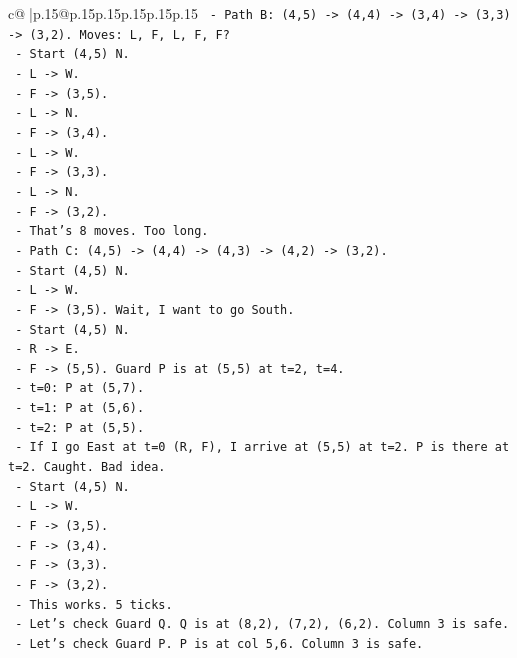 \documentclass{article}
\begin{document}
{\begin{supertabular}{c@{$\;$}|p{.15\linewidth}@{}p{.15\linewidth}p{.15\linewidth}p{.15\linewidth}p{.15\linewidth}p{.15\linewidth}}
{{{\texttt{    {-} Path B: (4,5) {-}> (4,4) {-}> (3,4) {-}> (3,3) {-}> (3,2). Moves: L, F, L, F, F?} \\
\texttt{      {-} Start (4,5) N.} \\
\texttt{      {-} L {-}> W.} \\
\texttt{      {-} F {-}> (3,5).} \\
\texttt{      {-} L {-}> N.} \\
\texttt{      {-} F {-}> (3,4).} \\
\texttt{      {-} L {-}> W.} \\
\texttt{      {-} F {-}> (3,3).} \\
\texttt{      {-} L {-}> N.} \\
\texttt{      {-} F {-}> (3,2).} \\
\texttt{      {-} That's 8 moves. Too long.} \\
\texttt{    {-} Path C: (4,5) {-}> (4,4) {-}> (4,3) {-}> (4,2) {-}> (3,2).} \\
\texttt{      {-} Start (4,5) N.} \\
\texttt{      {-} L {-}> W.} \\
\texttt{      {-} F {-}> (3,5). Wait, I want to go South.} \\
\texttt{      {-} Start (4,5) N.} \\
\texttt{      {-} R {-}> E.} \\
\texttt{      {-} F {-}> (5,5). Guard P is at (5,5) at t=2, t=4.} \\
\texttt{        {-} t=0: P at (5,7).} \\
\texttt{        {-} t=1: P at (5,6).} \\
\texttt{        {-} t=2: P at (5,5).} \\
\texttt{        {-} If I go East at t=0 (R, F), I arrive at (5,5) at t=2. P is there at t=2. Caught. Bad idea.} \\
\texttt{      {-} Start (4,5) N.} \\
\texttt{      {-} L {-}> W.} \\
\texttt{      {-} F {-}> (3,5).} \\
\texttt{      {-} F {-}> (3,4).} \\
\texttt{      {-} F {-}> (3,3).} \\
\texttt{      {-} F {-}> (3,2).} \\
\texttt{      {-} This works. 5 ticks.} \\
\texttt{      {-} Let's check Guard Q. Q is at (8,2), (7,2), (6,2). Column 3 is safe.} \\
\texttt{      {-} Let's check Guard P. P is at col 5,6. Column 3 is safe.} \\
}}}
\end{supertabular}}
\end{document}
